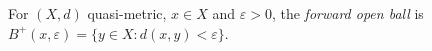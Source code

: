
For $(X,d)$ quasi-metric, $x\in X$ and $\varepsilon>0$, the \emph{forward open ball} is $B^+(x,\varepsilon)=\{y\in X:d(x,y)<\varepsilon\}$.
